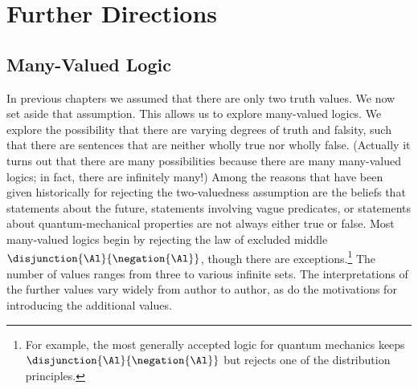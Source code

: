 
\chapter{Further Directions}\label{furtherdirections}

\section{Many-Valued Logic}


In previous chapters we assumed that there are only two truth values. We now set aside that assumption. This allows us to explore many-valued logics. 
We explore the possibility that there are varying degrees of truth and falsity, such that there are sentences that are neither wholly true nor wholly false.
(Actually it turns out that there are many possibilities because there are many many-valued logics; in fact, there are infinitely many!) 
Among the reasons that have been given historically for rejecting the two-valuedness assumption are the beliefs that statements about the future, statements involving vague predicates, or statements about quantum-mechanical properties are not always either true or false. 
Most many-valued logics begin by rejecting the law of excluded middle $\disjunction{\Al}{\negation{\Al}}$, though there are exceptions.\footnote{For example, the most generally accepted logic for quantum mechanics keeps	$\disjunction{\Al}{\negation{\Al}}$ but rejects one of the distribution principles.} 
The number of values ranges from three to various infinite sets. 
The interpretations of the further values vary widely from author to author, as do the motivations for introducing the additional values. 


